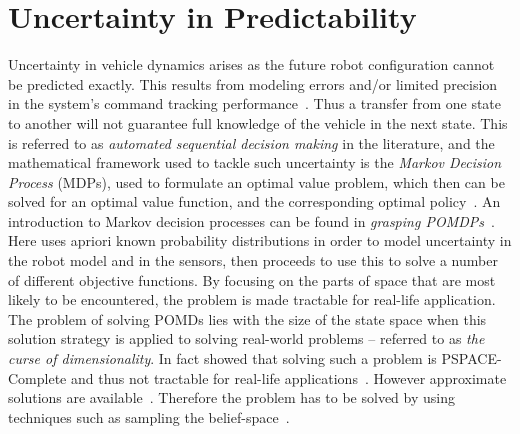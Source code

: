 \section{Uncertainty in Predictability}
Uncertainty in vehicle dynamics arises as the future robot configuration cannot
be predicted exactly. This results from modeling errors and/or limited precision
in the system's command tracking
performance~\cite{dadkhahSurveyMotionPlanning2012}. Thus a transfer from one
state to another will not guarantee full knowledge of the vehicle in the next
state. This is referred to as \textit{automated sequential decision making} in
the literature, and the mathematical framework used to tackle such uncertainty
is the \textit{Markov Decision Process} (MDPs), used to formulate an optimal
value problem, which then can be solved for an optimal value function, and the
corresponding optimal policy~\cite{Cassandra:1998:EAA:926710}. An introduction
to Markov decision processes can be found in \textit{grasping
  POMDPs}~\cite{kaelblingPlanningActingPartially1998}. Here
\citeauthor{kaelblingPlanningActingPartially1998} uses apriori known probability
distributions in order to model uncertainty in the robot model and in the
sensors, then proceeds to use this to solve a number of different objective
functions. By focusing on the parts of space that are most likely to be
encountered, the problem is made tractable for real-life application. The
problem of solving POMDs lies with the size of the state space when this
solution strategy is applied to solving real-world problems -- referred to as
\textit{the curse of dimensionality}. In fact
\citeauthor{christosh.papadimitriouComplexityMarkovDecision1987} showed that
solving such a problem is PSPACE-Complete and thus not tractable for real-life
applications~\cite{christosh.papadimitriouComplexityMarkovDecision1987}. However
approximate solutions are available~\cite{kaelblingPlanningActingPartially1998}.
Therefore the problem has to be solved by using techniques such as sampling the
belief-space~\cite{kearns2002sparse}.

